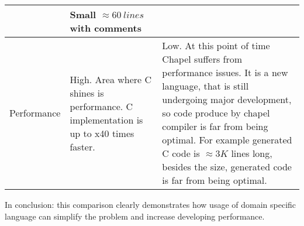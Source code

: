 \documentclass{article}
\begin{document}
\begin{centering}
\begin{table}[h!]
\begin{tabular}{l| p{7.5cm} | p{7.5cm}}
                &  
                    Small $\approx 60\ lines$ with comments
                \\ \hline
                
              Performance   
                & High. Area where C shines is performance. C implementation is up to x40 times
                faster.
                & Low. At this point of time Chapel suffers from performance issues. It is a new
                language, that is still undergoing major development, so code produce by chapel
                compiler is far from being optimal. For example generated C code is $\approx 3K$
                lines long, besides the size, generated code is far from being optimal.

            \end{tabular}
        \end{table}
        \end{centering}

        In conclusion: this comparison clearly demonstrates how usage of domain specific language
        can simplify the problem and increase developing performance.


\end{document}
